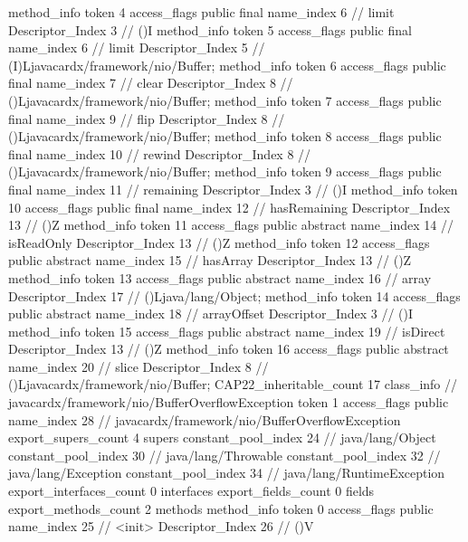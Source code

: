 {{{{{				}
				method_info {
					token	4
					access_flags	public final
					name_index	6		// limit
					Descriptor_Index	3		// ()I
				}
				method_info {
					token	5
					access_flags	public final
					name_index	6		// limit
					Descriptor_Index	5		// (I)Ljavacardx/framework/nio/Buffer;
				}
				method_info {
					token	6
					access_flags	public final
					name_index	7		// clear
					Descriptor_Index	8		// ()Ljavacardx/framework/nio/Buffer;
				}
				method_info {
					token	7
					access_flags	public final
					name_index	9		// flip
					Descriptor_Index	8		// ()Ljavacardx/framework/nio/Buffer;
				}
				method_info {
					token	8
					access_flags	public final
					name_index	10		// rewind
					Descriptor_Index	8		// ()Ljavacardx/framework/nio/Buffer;
				}
				method_info {
					token	9
					access_flags	public final
					name_index	11		// remaining
					Descriptor_Index	3		// ()I
				}
				method_info {
					token	10
					access_flags	public final
					name_index	12		// hasRemaining
					Descriptor_Index	13		// ()Z
				}
				method_info {
					token	11
					access_flags	public abstract
					name_index	14		// isReadOnly
					Descriptor_Index	13		// ()Z
				}
				method_info {
					token	12
					access_flags	public abstract
					name_index	15		// hasArray
					Descriptor_Index	13		// ()Z
				}
				method_info {
					token	13
					access_flags	public abstract
					name_index	16		// array
					Descriptor_Index	17		// ()Ljava/lang/Object;
				}
				method_info {
					token	14
					access_flags	public abstract
					name_index	18		// arrayOffset
					Descriptor_Index	3		// ()I
				}
				method_info {
					token	15
					access_flags	public abstract
					name_index	19		// isDirect
					Descriptor_Index	13		// ()Z
				}
				method_info {
					token	16
					access_flags	public abstract
					name_index	20		// slice
					Descriptor_Index	8		// ()Ljavacardx/framework/nio/Buffer;
				}
			}
			CAP22_inheritable_count	17
		}
		class_info {		// javacardx/framework/nio/BufferOverflowException
			token	1
			access_flags	public
			name_index	28		// javacardx/framework/nio/BufferOverflowException
			export_supers_count	4
			supers {
				constant_pool_index	24		// java/lang/Object
				constant_pool_index	30		// java/lang/Throwable
				constant_pool_index	32		// java/lang/Exception
				constant_pool_index	34		// java/lang/RuntimeException
			}
			export_interfaces_count	0
			interfaces {
			}
			export_fields_count	0
			fields {
			}
			export_methods_count	2
			methods {
				method_info {
					token	0
					access_flags	public
					name_index	25		// <init>
					Descriptor_Index	26		// ()V
}}}}}

